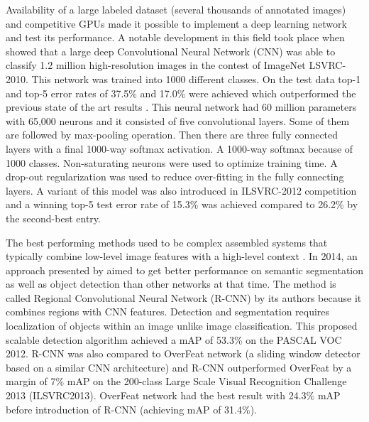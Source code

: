 \documentclass[11pt]{article}
\begin{document}
Availability of a large labeled dataset (several thousands of annotated images) and competitive GPUs made it possible to implement a deep learning network and test its performance. A notable development in this field took place when \cite{krizhevsky2012imagenet} showed that a large deep Convolutional Neural Network (CNN)  was able to classify 1.2 million high-resolution images in the contest of ImageNet LSVRC-2010. This network was trained into 1000 different classes. On the test data top-1 and top-5 error rates of 37.5\% and 17.0\% were achieved which outperformed the previous state of the art results \cite{krizhevsky2012imagenet}. This neural network had 60 million parameters with 65,000 neurons and it consisted of five convolutional layers. Some of them are followed by max-pooling operation. Then there are three fully connected layers with a final 1000-way softmax activation. A 1000-way softmax because of 1000 classes. Non-saturating neurons were used to optimize training time. A drop-out regularization was used to reduce over-fitting in the fully connecting layers. A variant of this model was also introduced in ILSVRC-2012 competition and a winning top-5 test error rate of 15.3\% was achieved
compared to 26.2\% by the second-best entry.

The best performing methods used to be complex assembled systems that typically combine low-level image features with a high-level context \cite{girshick_rich_2013}. In 2014, an approach presented by \cite{girshick_rich_2013} aimed to get better performance on semantic segmentation as well as object detection than other networks at that time. The method is called Regional Convolutional Neural Network (R-CNN) by its authors because it combines regions with CNN features. Detection and segmentation requires localization of objects within an image unlike image classification. This proposed scalable detection algorithm achieved a mAP of 53.3\% on the PASCAL VOC 2012. R-CNN was also compared to OverFeat network (a sliding window detector based on a similar CNN architecture) and R-CNN outperformed OverFeat by a margin of 7\% mAP on the 200-class Large Scale Visual Recognition Challenge 2013 (ILSVRC2013). OverFeat network had the best result with 24.3\% mAP before introduction of R-CNN (achieving mAP of 31.4\%).
\end{document}
